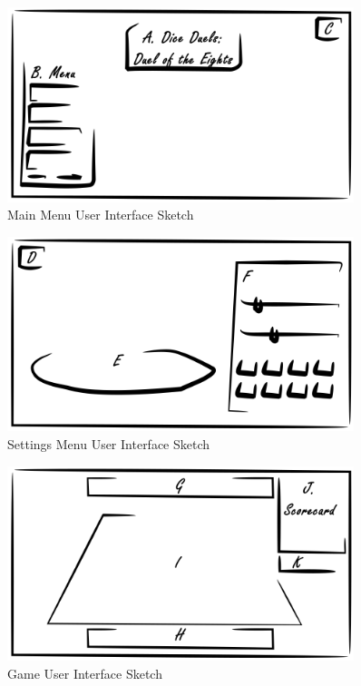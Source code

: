 \documentclass[12pt, titlepage]{article}
\begin{document}
\begin{figure}[h!]
\caption{Main Menu User Interface Sketch}
\centering
\includegraphics[width=0.9\textwidth]{figures/main_menu}
\end{figure}



\begin{figure}[h!]
\caption{Settings Menu User Interface Sketch}
\centering
\includegraphics[width=0.9\textwidth]{figures/settings}
\end{figure}



\begin{figure}[h!]
\caption{Game User Interface Sketch}
\centering
\includegraphics[width=0.9\textwidth]{figures/game_interface}
\end{figure}
\end{document}
